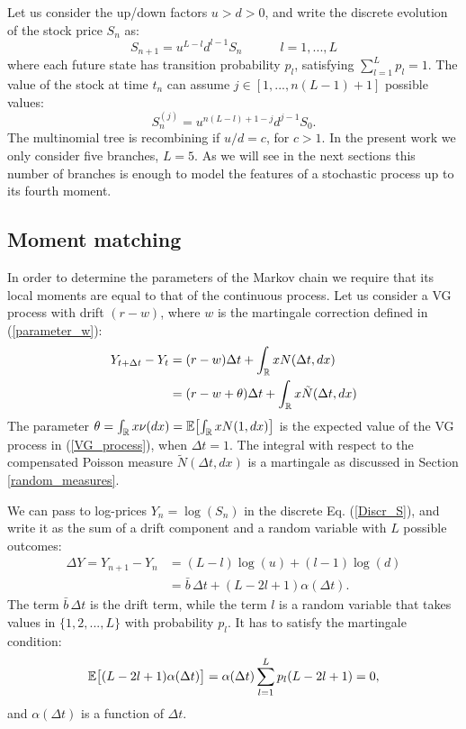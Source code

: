 Let us consider the up/down factors $u>d>0$, and write the discrete evolution of the stock price $S_n$ as:
\begin{equation}\label{Discr_S}
  S_{n+1} = u^{L-l}d^{l-1} S_n  \hspace{3em} l=1, ... , L  
\end{equation}
where each future state has transition probability $p_l$, satisfying $\sum_{l=1}^L p_l = 1$.
The value of the stock at time $t_n$ can assume $j \in [1,...,n(L-1)+1]$ possible values:
\begin{equation}\label{Discr_S2}
  S_{n}^{(j)} = u^{n(L-l)+1-j}d^{j-1} S_0.  
\end{equation}
The multinomial tree is recombining if $u/d = c$, for $c>1$.
In the present work we only consider five branches, $L=5$. As we will see in the next sections this number of branches is 
enough to model the features of a stochastic process up to its fourth moment.


\subsection{Moment matching}

In order to determine the parameters of the Markov chain we require that its local moments are equal to that of the continuous process.
Let us consider a VG process with drift $(r-w)$, where $w$ is the martingale correction defined in (\ref{parameter_w}): 
\begin{align}\label{log_martingale}
 Y_{t+\Delta t}-Y_t &= (r-w)\Delta t + \int_{\mathbb{R}} x N(\Delta t,dx) \\ \nonumber
		    &= (r-w + \theta)\Delta t + \int_{\mathbb{R}} x \tilde N(\Delta t,dx)
\end{align}
The parameter $\theta = \int_{\mathbb{R}} x \nu(dx) = \mathbb{E} \bigl[ \int_{\mathbb{R}} x N(1,dx) \bigr]$ is the expected value of the VG process in (\ref{VG_process}), 
when $\Delta t=1$. 
The integral with respect to the compensated Poisson measure $\tilde N(\Delta t,dx)$ is a martingale as discussed in Section \ref{random_measures}.

We can pass to log-prices $Y_n = \log(S_n)$ in the discrete Eq. (\ref{Discr_S}), and write it as the sum of a drift component and a 
random variable with $L$ possible outcomes:
\begin{align}\label{Discr_Y}
 \Delta Y = Y_{n+1} - Y_n &= (L-l) \log(u) + (l-1) \log(d) \\ \nonumber
  &= \bar b\, \Delta t + (L-2l+1) \alpha(\Delta t).
\end{align}
The term $\bar b\, \Delta t$ is the drift term, while the term $l$ is a random variable that takes values in $\{1,2,...,L\}$ with probability $p_l$. 
It has to satisfy the martingale condition:
$$ \mathbb{E} \bigl[(L-2l+1) \alpha(\Delta t) \bigr] = \alpha(\Delta t) \sum_{l=1}^L p_l (L-2l+1) = 0, $$
and $\alpha(\Delta t)$ is a function of $\Delta t$.

